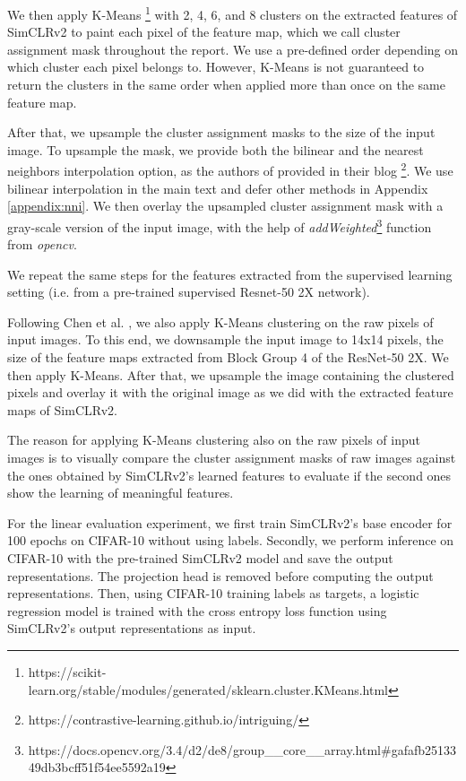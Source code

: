     We then apply K-Means \footnote{https://scikit-learn.org/stable/modules/generated/sklearn.cluster.KMeans.html\label{scklearn: K-Means}} with 2, 4, 6, and 8 clusters
    on the extracted features of SimCLRv2 to paint each pixel of the feature map, which we call cluster assignment mask throughout the report. We use a pre-defined order depending on which cluster each pixel belongs to. However, K-Means is not guaranteed to return the clusters in the same order when applied more than once on the same feature map.
    
    After that, we upsample the cluster assignment masks to the size of the input image. To upsample the mask, we provide both the bilinear and the nearest neighbors interpolation option, as the authors of \cite{chen2021intriguing} provided in their blog \footnote{https://contrastive-learning.github.io/intriguing/\label{SimCLR_Properties:blog}}. We use bilinear interpolation in the main text and defer other methods in Appendix \ref{appendix:nni}. We then overlay the upsampled cluster assignment mask with a gray-scale version of the input image, with the help of \textit{addWeighted}\footnote{https://docs.opencv.org/3.4/d2/de8/group\_\_core\_\_array.html\#gafafb2513349db3bcff51f54ee5592a19\label{opencv:addWeighted}} function from \textit{opencv}.

    We repeat the same steps for the features extracted from the supervised learning setting (i.e. from a pre-trained supervised Resnet-50 2X network).

    Following Chen et al. \cite{chen2021intriguing}, we also apply K-Means clustering on the raw pixels of input images.
    To this end, we downsample the input image to 14x14 pixels, the size of the feature maps extracted from Block Group 4 of the ResNet-50 2X. We then apply K-Means.
    After that, we upsample the image containing the clustered pixels and overlay it with the original image as we did with the extracted feature maps of SimCLRv2.
        
    The reason for applying K-Means clustering also on the raw pixels of input images is to visually compare the cluster assignment masks of raw images against the ones obtained by SimCLRv2's learned features to evaluate if the second ones show the learning of meaningful features. 
    
    For the linear evaluation experiment, we first train SimCLRv2's base encoder for 100 epochs on CIFAR-10 without using labels. 
    Secondly, we perform inference on CIFAR-10 with the pre-trained SimCLRv2 model and save the output representations.
    The projection head is removed before computing the output representations. 
    Then, using CIFAR-10 training labels as targets, a logistic regression model is trained with the cross entropy loss function using SimCLRv2's output representations as input.
    
